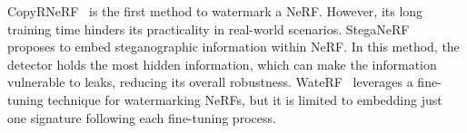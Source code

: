 CopyRNeRF~\cite{luo2023copyrnerf} is the first method to watermark a NeRF. However, its long training time hinders its practicality in real-world scenarios. StegaNeRF~\cite{li2023steganerf} proposes to embed steganographic information within NeRF. In this method, the detector holds the most hidden information, which can make the information vulnerable to leaks, reducing its overall robustness. WateRF~\cite{jang2024waterf} leverages a fine-tuning technique for watermarking NeRFs, but it is limited to embedding just one signature following each fine-tuning process.